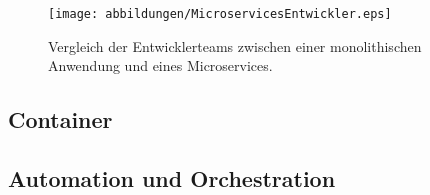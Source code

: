 \begin{figure}[ht!]
\centering
\caption{Vergleich der Entwicklerteams zwischen einer monolithischen Anwendung und eines Microservices.}
\texttt{[image: abbildungen/MicroservicesEntwickler.eps]}
\cite[Quelle: In Anlehnung an][S.82]{albrecht2020}
\label{fig:entwickler}
\end{figure}


\subsection{Container}


\subsection{Automation und Orchestration}
